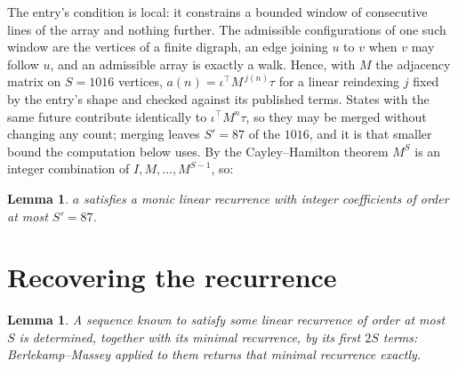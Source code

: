 \documentclass[11pt,a4paper]{article}
\theoremstyle{plain}
\newtheorem{lemma}[theorem]{Lemma}
\theoremstyle{definition}
\begin{document}
The entry's condition is local: it constrains a bounded window of consecutive lines of the
array and nothing further. The admissible configurations of one such window are the vertices
of a finite digraph, an edge joining $u$ to $v$ when $v$ may follow $u$, and an admissible
array is exactly a walk. Hence, with $M$ the adjacency matrix on $S=1016$ vertices,
$a(n)=\iota^{\!\top}M^{\,j(n)}\tau$ for a linear reindexing $j$ fixed by the entry's shape
and checked against its published terms. States with the same future contribute identically to $\iota^{\!\top}M^n\tau$, so they may be merged without changing any count; merging leaves $S'=87$ of the $1016$, and it is that smaller bound the computation below uses. By the Cayley--Hamilton theorem $M^{S}$ is an
integer combination of $I,M,\dots,M^{S-1}$, so:

\begin{lemma}\label{lem:cf}
$a$ satisfies a monic linear recurrence with integer coefficients of order at most
$S'=87$.
\end{lemma}

\section{Recovering the recurrence}

\begin{lemma}\label{lem:bm}
A sequence known to satisfy some linear recurrence of order at most $S$ is determined, together
with its minimal recurrence, by its first $2S$ terms: Berlekamp--Massey applied to them returns
that minimal recurrence exactly.
\end{lemma}
\end{document}

